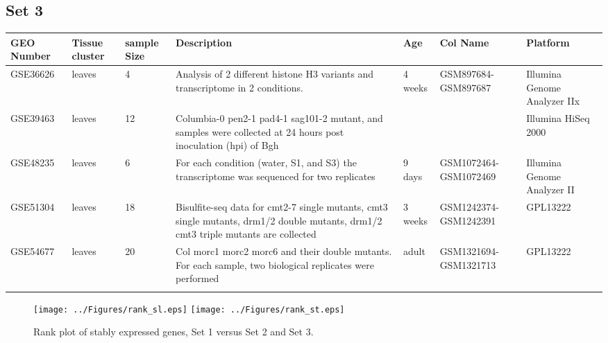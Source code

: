 \documentclass[11pt, a4paper]{article}
\begin{document}
\begin{landscape}
\subsection{Set 3}
\begin{table}
\footnotesize
\centering
\begin{tabular}{p{2cm}p{3cm}p{1cm}p{4cm}p{2.4cm}p{3cm}p{4cm}} \hline
GEO Number &Tissue cluster & sample Size & Description & Age  &Col Name & Platform\\ \hline
GSE36626 &leaves & 4 &Analysis of 2 different histone H3 variants and transcriptome in 2 conditions.  & 4 weeks &GSM897684-GSM897687 & Illumina Genome Analyzer IIx \\ \hdashline
GSE39463 &leaves  &12		&Columbia-0 pen2-1 pad4-1 sag101-2 mutant, and samples were collected at 24 hours post inoculation (hpi) of Bgh & & &Illumina HiSeq 2000 \\ \hdashline
GSE48235 &leaves & 6  & For each condition (water, S1, and S3) the transcriptome was sequenced for two replicates & 9 days & GSM1072464-GSM1072469  &Illumina Genome Analyzer II \\	\hdashline
GSE51304 &leaves  & 18 &Bisulfite-seq data for cmt2-7 single mutants, cmt3 single mutants, drm1/2 double mutants, drm1/2 cmt3 triple mutants are collected  & 3 weeks & GSM1242374-GSM1242391 &GPL13222 \\ \hdashline
GSE54677 & leaves   &20  &Col morc1 morc2 morc6 and their double mutants. For each sample, two biological replicates were performed &adult & GSM1321694-GSM1321713	 &	GPL13222\\ \hdashline
\end{tabular} 
\end{table}
\end{landscape}


 \begin{figure}[h!]
\begin{center}
\texttt{[image: ../Figures/rank\_sl.eps]}
\texttt{[image: ../Figures/rank\_st.eps]}
\caption{\label{fig:rankAgainstrank} Rank plot of stably expressed genes,  Set 1 versus Set 2 and Set 3.}
\end{center}
\end{figure}

\newpage




\end{document}
